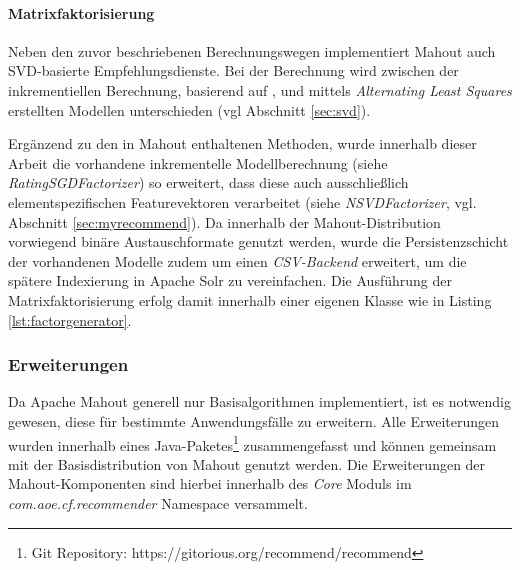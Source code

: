  

\paragraph{Matrixfaktorisierung} Neben den zuvor beschriebenen Berechnungswegen implementiert Mahout auch \acs{SVD}-basierte Empfehlungsdienste. Bei der Berechnung wird zwischen der inkrementiellen Berechnung, basierend auf \citep{funk2006}, und mittels \textit{Alternating Least Squares} \citep{Bell:2007:SCF:1441428.1442050,zhou08} erstellten Modellen unterschieden (vgl Abschnitt \ref{sec:svd}).



Ergänzend zu den in Mahout enthaltenen Methoden, wurde innerhalb dieser Arbeit die vorhandene inkrementelle Modellberechnung (siehe \textit{RatingSGDFactorizer}) so erweitert, dass diese auch ausschließlich elementspezifischen Featurevektoren verarbeitet (siehe \textit{NSVDFactorizer}, vgl. Abschnitt \ref{sec:myrecommend}). Da innerhalb der Mahout-Distribution vorwiegend binäre Austauschformate genutzt werden, wurde die Persistenzschicht der vorhandenen Modelle zudem um einen \textit{CSV-Backend} erweitert, um die spätere Indexierung in Apache Solr zu vereinfachen. Die Ausführung der Matrixfaktorisierung erfolg damit innerhalb einer eigenen Klasse wie in Listing \ref{lst:factorgenerator}.

\subsubsection{Erweiterungen}\label{sec:mahoutext}

Da Apache Mahout generell nur Basisalgorithmen implementiert, ist es notwendig gewesen, diese für bestimmte Anwendungsfälle zu erweitern. Alle Erweiterungen wurden innerhalb eines Java-Paketes\footnote{Git Repository: https://gitorious.org/recommend/recommend } zusammengefasst und können gemeinsam mit der Basisdistribution von Mahout genutzt werden. Die Erweiterungen der Mahout-Komponenten sind hierbei innerhalb des \textit{Core} Moduls im \textit{com.aoe.cf.recommender} Namespace versammelt.

